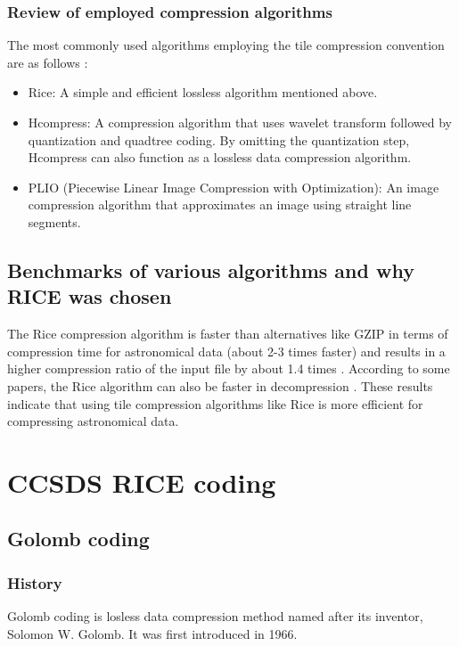 \documentclass[licencjacka,en]{pracamgr}
\begin{document}
\subsubsection{Review of employed compression algorithms}

The most commonly used algorithms employing the tile compression convention are as follows \cite{rice-comp}:

\begin{itemize}
\item Rice: A simple and efficient lossless algorithm mentioned above.
\item Hcompress: A compression algorithm that uses wavelet transform followed by quantization and quadtree coding. By omitting the quantization step, Hcompress can also function as a lossless data compression algorithm.
\item PLIO (Piecewise Linear Image Compression with Optimization): An image compression algorithm that approximates an image using straight line segments.
\end{itemize}

\subsection{Benchmarks of various algorithms and why RICE was chosen}
The Rice compression algorithm is faster than alternatives like GZIP in terms of compression time for astronomical data (about 2-3 times faster) and results in a higher compression ratio of the input file by about 1.4 times \cite{rice-comp}. According to some papers, the Rice algorithm can also be faster in decompression \cite{why-rice}. These results indicate that using tile compression algorithms like Rice is more efficient for compressing astronomical data.

\section{CCSDS RICE coding}

\subsection{Golomb coding}
\subsubsection{History}
Golomb coding is losless data compression method named after its inventor, Solomon W. Golomb. It was first introduced in 1966. \cite{golomb-original}
\end{document}
